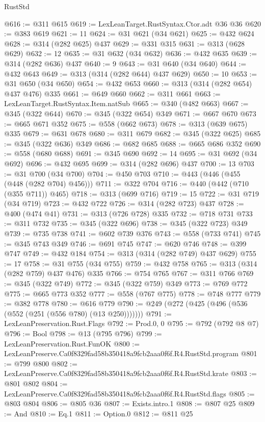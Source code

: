 \begin{lexlean}{RustStd}
\begin{coremodule}
@616 := @311 @615
@619 := LexLeanTarget.RustSyntax.Ctor.adt @36 @36
@620 := @383 @619
@621 := 11
@624 := @31 @621 (@34 @621)
@625 := @432 @624
@628 := @314 (@282 @625) @437
@629 := @331 @315
@631 := @313 (@628 @629)
@632 := 12
@635 := @31 @632 (@34 @632)
@636 := @432 @635
@639 := @314 (@282 @636) @437
@640 := 9
@643 := @31 @640 (@34 @640)
@644 := @432 @643
@649 := @313 (@314 (@282 @644) @437 @629)
@650 := 10
@653 := @31 @650 (@34 @650)
@654 := @432 @653
@660 := @313 (@314 (@282 @654) @437 @476) @335
@661 := @649 @660
@662 := @311 @661
@663 := LexLeanTarget.RustSyntax.Item.natSub
@665 := @340 (@482 @663)
@667 := @345 (@322 @644)
@670 := @345 (@322 @654) @349
@671 := @667 @670
@673 := @665 @671 @352
@675 := @558 (@662 @673)
@678 := @313 (@639 @675) @335
@679 := @631 @678
@680 := @311 @679
@682 := @345 (@322 @625)
@685 := @345 (@322 @636) @349
@686 := @682 @685
@688 := @665 @686 @352
@690 := @558 (@680 @688)
@691 := @345 @690
@692 := 14
@695 := @31 @692 (@34 @692)
@696 := @432 @695
@699 := @314 (@282 @696) @437
@700 := 13
@703 := @31 @700 (@34 @700)
@704 := @450 @703
@710 := @443 (@446 (@455 (@448 (@282 @704) @456)))
@711 := @322 @704
@716 := @440 (@442 (@710 (@355 @711)) @465)
@718 := @313 (@699 @716)
@719 := 15
@722 := @31 @719 (@34 @719)
@723 := @432 @722
@726 := @314 (@282 @723) @437
@728 := @400 (@474 @41)
@731 := @313 (@726 @728) @335
@732 := @718 @731
@733 := @311 @732
@735 := @345 (@322 @696)
@738 := @345 (@322 @723) @349
@739 := @735 @738
@741 := @602 @739 @376
@743 := @558 (@733 @741)
@745 := @345 @743 @349
@746 := @691 @745
@747 := @620 @746
@748 := @399 @747
@749 := @432 @184
@754 := @313 (@314 (@282 @749) @437 @629)
@755 := 17
@758 := @31 @755 (@34 @755)
@759 := @432 @758
@765 := @313 (@314 (@282 @759) @437 @476) @335
@766 := @754 @765
@767 := @311 @766
@769 := @345 (@322 @749)
@772 := @345 (@322 @759) @349
@773 := @769 @772
@775 := @665 @773 @352
@777 := @558 (@767 @775)
@778 := @748 @777
@779 := @382 @778
@780 := @616 @779
@790 := @249 (@272 (@425 (@496 (@536 (@552 (@251 (@556 @780) (@13 @250)))))))
@791 := LexLeanPreservation.Rust.Flags
@792 := Prod.{0, 0}
@795 := @792 (@792 @8 @7)
@796 := Bool
@798 := @13 (@795 @796)
@799 := LexLeanPreservation.Rust.FunOK
@800 := LexLeanPreserve.Ca0f8329fad58b350418a9fcb2aaa0f6f.R4.RustStd.program
@801 := @799 @800
@802 := LexLeanPreserve.Ca0f8329fad58b350418a9fcb2aaa0f6f.R4.RustStd.krate
@803 := @801 @802
@804 := LexLeanPreserve.Ca0f8329fad58b350418a9fcb2aaa0f6f.R4.RustStd.flags
@805 := @803 @804
@806 := @805 @36
@807 := Exists.intro.{1}
@808 := @807 @25
@809 := And
@810 := Eq.{1}
@811 := Option.{0}
@812 := @811 @25

\end{coremodule}
\end{lexlean}
